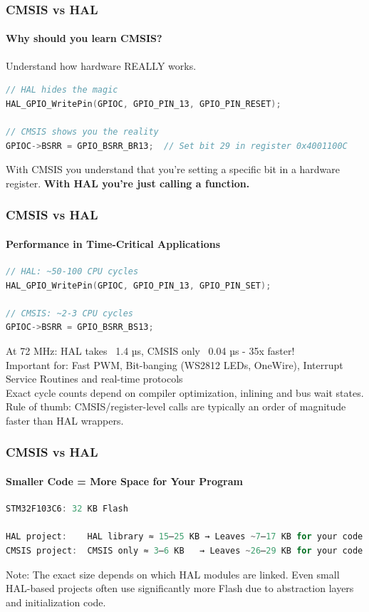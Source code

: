 \documentclass{beamer}
\begin{document}
\begin{frame}[fragile]
	\frametitle{CMSIS vs HAL}
	\framesubtitle{Why should you learn CMSIS?}
	Understand how hardware REALLY works.
	\begin{lstlisting}[language=C]
// HAL hides the magic
HAL_GPIO_WritePin(GPIOC, GPIO_PIN_13, GPIO_PIN_RESET);
		
// CMSIS shows you the reality
GPIOC->BSRR = GPIO_BSRR_BR13;  // Set bit 29 in register 0x4001100C
	\end{lstlisting}
	With CMSIS you understand that you're setting a specific bit in a hardware register. \textbf{With HAL you're just calling a function.}
\end{frame}
\begin{frame}[fragile]
	\frametitle{CMSIS vs HAL}
	\framesubtitle{Performance in Time-Critical Applications}
	\begin{lstlisting}[language=C]
// HAL: ~50-100 CPU cycles
HAL_GPIO_WritePin(GPIOC, GPIO_PIN_13, GPIO_PIN_SET);
		
// CMSIS: ~2-3 CPU cycles
GPIOC->BSRR = GPIO_BSRR_BS13;
	\end{lstlisting}
	At 72 MHz: HAL takes ~1.4 µs, CMSIS only ~0.04 µs - 35x faster!\\
	\vspace{0.2cm}
	Important for: Fast PWM, Bit-banging (WS2812 LEDs, OneWire), Interrupt Service Routines and real-time protocols\\
	\vspace{0.2cm}
	\footnotesize{Exact cycle counts depend on compiler optimization, inlining and bus wait states.
		Rule of thumb: CMSIS/register-level calls are typically an order of magnitude faster than HAL wrappers.}
	
\end{frame}
\begin{frame}[fragile]
	\frametitle{CMSIS vs HAL}
	\framesubtitle{Smaller Code = More Space for Your Program}
	\begin{lstlisting}[language=C]
STM32F103C6: 32 KB Flash
		
HAL project:    HAL library ≈ 15–25 KB → Leaves ~7–17 KB for your code
CMSIS project:  CMSIS only ≈ 3–6 KB   → Leaves ~26–29 KB for your code
	\end{lstlisting}
	\vspace{0.2cm}
	\footnotesize{Note: The exact size depends on which HAL modules are linked. 
		Even small HAL-based projects often use significantly more Flash due to 
		abstraction layers and initialization code.}
\end{frame}
\end{document}
